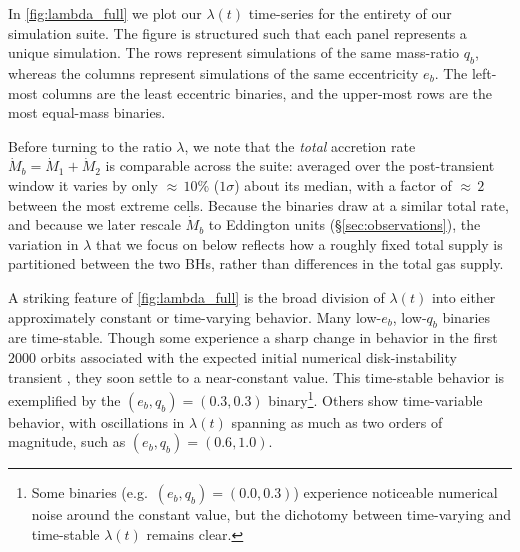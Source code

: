 \documentclass[fleqn,usenatbib]{mnras}
\begin{document}
In \autoref{fig:lambda_full} we plot our $\lambda(t)$ time-series for the entirety of our simulation suite. The figure is structured such that each panel represents a unique simulation. The rows represent simulations of the same mass-ratio $q_b$, whereas the columns represent simulations of the same eccentricity $e_b$. The left-most columns are the least eccentric binaries, and the upper-most rows are the most equal-mass binaries.

Before turning to the ratio $\lambda$, we note that the \textit{total} accretion rate $\dot{M}_b = \dot{M}_1 + \dot{M}_2$ is comparable across the suite: averaged over the post-transient window it varies by only ${\approx}\,10\%$ ($1\sigma$) about its median, with a factor of ${\approx}\,2$ between the most extreme cells. Because the binaries draw at a similar total rate, and because we later rescale $\dot{M}_b$ to Eddington units (\S\ref{sec:observations}), the variation in $\lambda$ that we focus on below reflects how a roughly fixed total supply is partitioned between the two BHs, rather than differences in the total gas supply.

A striking feature of \autoref{fig:lambda_full} is the broad division of $\lambda(t)$ into either approximately constant or time-varying behavior. Many low-$e_b$, low-$q_b$ binaries are time-stable. Though some experience a sharp change in behavior in the first $2000$ orbits associated with the expected initial numerical disk-instability transient \citep{moriwaki_04}, they soon settle to a near-constant value. This time-stable behavior is exemplified by the $(e_b, q_b) = (0.3, 0.3)$ binary\footnote{Some binaries (e.g.\ $(e_b, q_b) = (0.0, 0.3)$) experience noticeable numerical noise around the constant value, but the dichotomy between time-varying and time-stable $\lambda(t)$ remains clear.}. Others show time-variable behavior, with oscillations in $\lambda(t)$ spanning as much as two orders of magnitude, such as $(e_b, q_b) = (0.6, 1.0)$.
\end{document}

